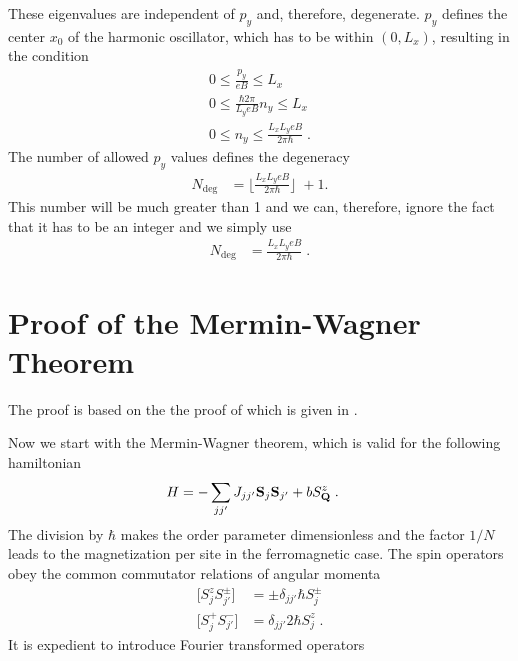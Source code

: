 %
These eigenvalues are independent of $p_{y}$ and, therefore, degenerate. $p_{y}$ defines the 
center $x_{0}$ of the harmonic oscillator, which has to be within $(0,L_{x})$, resulting in the condition
%
\begin{align*}
0\le \frac{p_{y}}{e B} \le L_{x} \\
0\le \frac{\hbar 2\pi }{L_{y} e B}n_{y} \le L_{x} \\
0\le n_{y} \le \frac{L_{x} L_{y} e B}{ 2\pi\hbar}\;.
\end{align*}
%
The number of allowed $p_{y}$ values defines the degeneracy
%
\begin{align*}
N_\text{deg} &= \bigg\lfloor\frac{L_{x} L_{y} e B}{ 2\pi\hbar }\bigg\rfloor\; +1.
\end{align*}
%
This number will be much greater than 1 and we can, therefore, ignore the fact that it has to be an integer and we simply use
\begin{align}
N_\text{deg} &= \frac{L_{x} L_{y} e B}{ 2\pi\hbar }\;.
\end{align}

\section{Proof of the Mermin-Wagner Theorem\label{app:mermin:wagner}}
The proof is based on the
%
the proof of which is given in .

Now we start with the Mermin-Wagner theorem, which is valid for the 
following  hamiltonian 
\begin{align}\label{eq:}
H &= -\sum_{jj'}J_{jj'} \mathbf S_{j} \mathbf S_{j'} + b    S^{z}_{\mathbf Q}\;.
\end{align}
%
%
The division by $\hbar$ makes the order parameter dimensionless and the factor
$1/N$ leads to the magnetization per site in the ferromagnetic case.
%
The  spin operators obey the common commutator relations of angular momenta
\begin{subequations}\label{eq:}
\begin{align}
\big[ S^{z}_{j} S^{\pm}_{j'}\big] &= \pm \delta_{jj'} \hbar S_{j}^{\pm}\\
\big[ S^{+}_{j} S^{-}_{j'}\big] &= \delta_{jj'} 2 \hbar S_{j}^{z}\;.
\end{align}
\end{subequations}
%
It is expedient to introduce Fourier transformed operators

